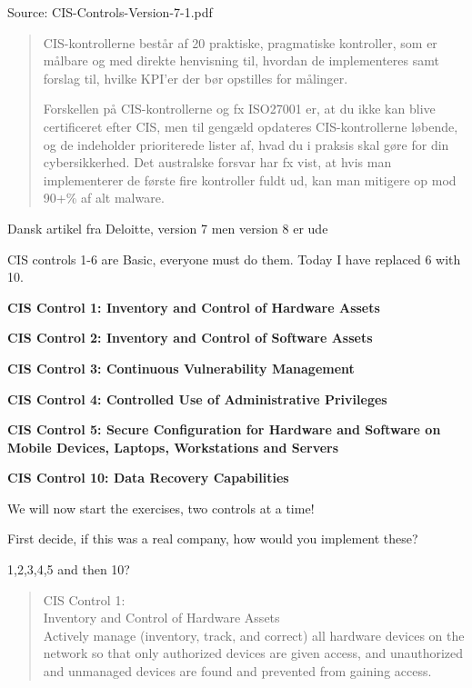 \documentclass[Screen16to9,17pt]{foils}
\begin{document}
Source:  CIS-Controls-Version-7-1.pdf



\begin{quote}
CIS-kontrollerne består af 20 praktiske, pragmatiske kontroller, som er målbare og med direkte henvisning til, hvordan de implementeres samt forslag til, hvilke KPI’er der bør opstilles for målinger.

Forskellen på CIS-kontrollerne og fx ISO27001 er, at du ikke kan blive certificeret efter CIS, men til gengæld opdateres CIS-kontrollerne løbende, og de indeholder prioriterede lister af, hvad du i praksis skal gøre for din cybersikkerhed. Det australske forsvar har fx vist, at hvis man implementerer de første fire kontroller fuldt ud, kan man mitigere op mod 90+\% af alt malware.
\end{quote}

Dansk artikel fra Deloitte, version 7 men version 8 er ude



CIS controls 1-6 are Basic, everyone must do them. Today I have replaced 6 with 10.

\begin{list2}
\item {\bf CIS Control 1: Inventory and Control of Hardware Assets}
\item {\bf CIS Control 2: Inventory and Control of Software Assets}
\item {\bf CIS Control 3: Continuous Vulnerability Management}
\item {\bf CIS Control 4: Controlled Use of Administrative Privileges}
\item {\bf CIS Control 5:
Secure Configuration for Hardware and Software on Mobile Devices, Laptops, Workstations and Servers}
\item {\bf CIS Control 10: Data Recovery Capabilities}
\end{list2}

We will now start the exercises, two controls at a time!

First decide, if this was a real company, how would you implement these?

1,2,3,4,5 and then 10?


\begin{quote}
CIS Control 1:\\
Inventory and Control of Hardware Assets\\
Actively manage (inventory, track, and correct) all hardware devices on the network so that only authorized devices are given access, and unauthorized and unmanaged devices are found and prevented from gaining access.
\end{quote}
\end{document}
